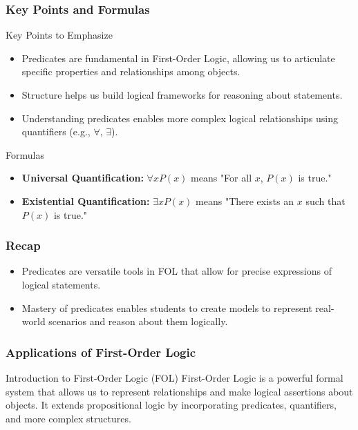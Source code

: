 \documentclass[aspectratio=169]{beamer}
\begin{document}
\begin{frame}[fragile]
    \frametitle{Key Points and Formulas}
    \begin{block}{Key Points to Emphasize}
        \begin{itemize}
            \item Predicates are fundamental in First-Order Logic, allowing us to articulate specific properties and relationships among objects.
            \item Structure helps us build logical frameworks for reasoning about statements.
            \item Understanding predicates enables more complex logical relationships using quantifiers (e.g., $\forall$, $\exists$).
        \end{itemize}
    \end{block}

    \begin{block}{Formulas}
        \begin{itemize}
            \item \textbf{Universal Quantification:} $\forall x P(x)$ means "For all $x$, $P(x)$ is true."
            \item \textbf{Existential Quantification:} $\exists x P(x)$ means "There exists an $x$ such that $P(x)$ is true."
        \end{itemize}
    \end{block}
\end{frame}

\begin{frame}[fragile]
    \frametitle{Recap}
    \begin{itemize}
        \item Predicates are versatile tools in FOL that allow for precise expressions of logical statements.
        \item Mastery of predicates enables students to create models to represent real-world scenarios and reason about them logically.
    \end{itemize}
\end{frame}

\begin{frame}[fragile]
    \frametitle{Applications of First-Order Logic}
    \begin{block}{Introduction to First-Order Logic (FOL)}
        First-Order Logic is a powerful formal system that allows us to represent relationships and make logical assertions about objects. It extends propositional logic by incorporating predicates, quantifiers, and more complex structures.
    \end{block}
\end{frame}
\end{document}
